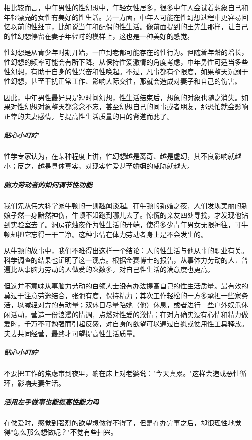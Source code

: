 \begin{enumerate}
相比较而言，中年男性的性幻想中，年轻女性居多，很多中年人会试着想象自己和年轻漂亮的女性有美好的性生活。另一方面，中年人可能在性幻想过程中更容易回忆以前的性细节，比如说当年和配偶的性生活。像前面提到的王先生那样，让自己的性幻想停留在妻子年轻时的模样上，这也是一种美好的感觉。

性幻想是从青少年时期开始，一直到老都可能存在的性行为。但随着年龄的增长，性幻想的频率可能会有所下降。从保持性爱激情的角度考虑，中年男性可适当多些性幻想，有助于自身的性兴奋和性唤起。不过，凡事都有个限度，如果整天沉溺于性幻想，甚至干扰正常工作、影响人际交往，那就会造成对妻子和自己的伤害。

因此，中年男性最好只是短时间幻想，性生活结束后，想象的对象也随之消失。如果对性幻想对象整天都念念不忘，甚至幻想自己的同事或者朋友，那恐怕就会影响正常的夫妻感情，与提高性生活质量的目的背道而驰了。

\subparagraph{贴心小叮咛}

性学专家认为，在某种程度上讲，性幻想越是离奇、越是虚幻，其不良影响就越小；反之，越是具体真实，对现实性爱甚至婚姻的威胁就越大。

\subparagraph{脑力劳动者的如何调节性功能}

我们先从伟大科学家牛顿的一则趣闻谈起。在牛顿的新婚之夜，人们发现美丽的新娘孑然一身黯然神伤，牛顿不知跑到哪儿去了。惊慌的亲友四处寻找，才发现他钻到实验室去了。洞房花烛夜作为性生活的开端，使得多少青年男女无限神往，可牛顿却把它忘得一干二净。这种事情在体力劳动者身上是不会发生的。

从牛顿的故事中，我们不难得出这样一个结论：人的性生活与他从事的职业有关。科学调查的结果也证明了这一观点。根据金赛博士的报告，从事体力劳动的人，普遍比从事脑力劳动的人做爱的次数多，对自己性生活的满意度也更高。

但这并不意味从事脑力劳动的白领人士没有办法提高自己的性生活质量。最有效的莫过于注意劳逸结合，张弛有度，保持精力；其次工作轻松的一方多承担一些家务活，以减轻对方的劳动量；双休日尽量陪她（他）休息，或者进行一些户外娱乐休闲活动，营造一份浪漫的情调，点燃对性爱的激情；在对方确实没有心情和精力做爱时，千万不可勉强而引起反感，对自身的欲望可以通过自慰或使用性工具释放。夫妻共同经营，最终才可望提高性生活质量。

\subparagraph{贴心小叮咛}

不要把工作的焦虑带到夜里，躺在床上对老婆说："今天真累。"这样会造成恶性循环，影响夫妻生活。

\subparagraph{活用左手做事也能提高性能力吗}

在做爱时，感觉到强烈的欲望想做得不得了，但是在办完事之后，却很理性地觉得"怎么那么想做呢？"不觉有些扫兴。


\end{enumerate}
